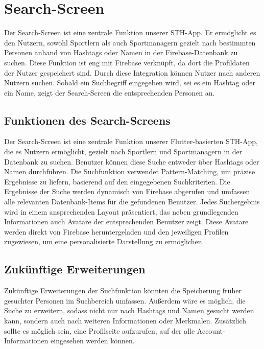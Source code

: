 \chapter{Search-Screen}
Der Search-Screen ist eine zentrale Funktion unserer STH-App. Er ermöglicht es den Nutzern, sowohl Sportlern als auch Sportmanagern gezielt nach bestimmten Personen anhand von Hashtags oder Namen in der Firebase-Datenbank zu suchen. 
Diese Funktion ist eng mit Firebase verknüpft, da dort die Profildaten der Nutzer gespeichert sind. Durch diese Integration können Nutzer nach anderen Nutzern suchen. 
Sobald ein Suchbegriff eingegeben wird, sei es ein Hashtag oder ein Name, zeigt der Search-Screen die entsprechenden Personen an.

\section{Funktionen des Search-Screens}
Der Search-Screen ist eine zentrale Funktion unserer Flutter-basierten STH-App, die es Nutzern ermöglicht, gezielt nach Sportlern und Sportmanagern in der Datenbank zu suchen. 
Benutzer können diese Suche entweder über Hashtags oder Namen durchführen. Die Suchfunktion verwendet Pattern-Matching, um präzise Ergebnisse zu liefern, basierend auf den eingegebenen Suchkriterien.
Die Ergebnisse der Suche werden dynamisch von Firebase abgerufen und umfassen alle relevanten Datenbank-Items für die gefundenen Benutzer. Jedes Suchergebnis wird in einem ansprechenden Layout präsentiert, das neben grundlegenden Informationen auch Avatare der entsprechenden Benutzer zeigt. Diese Avatare werden direkt von Firebase heruntergeladen und den jeweiligen Profilen zugewiesen, um eine personalisierte Darstellung zu ermöglichen.


\section{Zukünftige Erweiterungen}
Zukünftige Erweiterungen der Suchfunktion könnten die Speicherung früher gesuchter Personen im Suchbereich umfassen. Außerdem wäre es möglich, die Suche zu erweitern, sodass nicht nur nach Hashtags und Namen gesucht werden kann, sondern auch nach weiteren Informationen oder Merkmalen. Zusätzlich sollte es möglich sein, eine Profilseite aufzurufen, auf der alle Account-Informationen eingesehen werden können.
